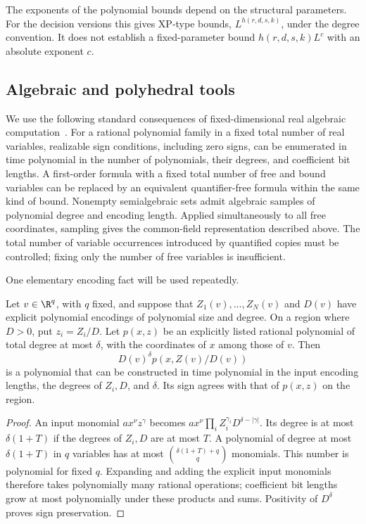 The exponents of the polynomial bounds depend on the structural
parameters. For the decision versions this gives XP-type bounds,
$L^{h(r,d,s,k)}$, under the degree convention. It does not establish a
fixed-parameter bound $h(r,d,s,k)L^c$ with an absolute exponent $c$.

\subsection{Algebraic and polyhedral tools}\label{subsec:tools}

We use the following standard consequences of fixed-dimensional real
algebraic computation~\cite[Theorem 1.3.1 and Section 3.1.3]{BasuPollackRoy1996}.
For a rational polynomial family in a fixed total number of real
variables, realizable sign conditions, including zero signs, can be
enumerated in time polynomial in the number of polynomials, their degrees,
and coefficient bit lengths. A first-order formula with a fixed total
number of free and bound variables can be replaced by an equivalent
quantifier-free formula within the same kind of bound. Nonempty
semialgebraic sets admit algebraic samples of polynomial degree and
encoding length. Applied simultaneously to all free coordinates, sampling
gives the common-field representation described above. The total number
of variable occurrences introduced by quantified copies must be controlled;
fixing only the number of free variables is insufficient.

One elementary encoding fact will be used repeatedly.
\begin{lemma}\label{lem:substitution}
Let $v\in\R^q$, with $q$ fixed, and suppose that $Z_1(v),\ldots,Z_N(v)$
and $D(v)$ have explicit polynomial encodings of polynomial size and degree.
On a region where $D>0$, put $z_i=Z_i/D$. Let $p(x,z)$ be an explicitly
listed rational polynomial of total degree at most $\delta$, with the
coordinates of $x$ among those of $v$. Then
\[
             D(v)^\delta p(x,Z(v)/D(v))
\]
is a polynomial that can be constructed in time polynomial in the input
encoding lengths, the degrees of $Z_i,D$, and $\delta$. Its sign agrees
with that of $p(x,z)$ on the region.
\end{lemma}
\begin{proof}
An input monomial $a x^\nu z^\gamma$ becomes
$a x^\nu\prod_iZ_i^{\gamma_i}D^{\delta-|\gamma|}$.
Its degree is at most $\delta(1+T)$ if the degrees of $Z_i,D$ are at
most $T$. A polynomial of degree at most $\delta(1+T)$ in $q$ variables
has at most $\binom{\delta(1+T)+q}{q}$ monomials. This number is
polynomial for fixed $q$. Expanding and adding the explicit input
monomials therefore takes polynomially many rational operations;
coefficient bit lengths grow at most polynomially under these products
and sums. Positivity of $D^\delta$ proves sign preservation.
\end{proof}

